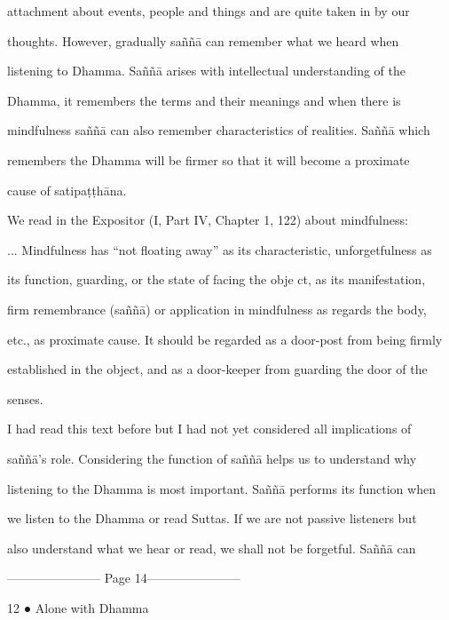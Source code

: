 attachment  about  events,  people  and  things  and  are  quite  taken  in  by  our  

thoughts.   However,   gradually   saññā   can   remember   what   we   heard   when  

listening   to   Dhamma.   Saññā   arises   with   intellectual   understanding   of   the  

Dhamma,   it   remembers   the   terms   and   their   meanings   and   when   there   is  

mindfulness saññā can also remember characteristics of realities. Saññā which  

remembers  the  Dhamma  will  be  firmer  so  that  it  will  become  a  proximate  

cause of satipaṭṭhāna. 



   We read in the Expositor (I, Part IV, Chapter 1, 122) about mindfulness: 



      ... Mindfulness has  “not floating away” as its characteristic, unforgetfulness as  

      its function, guarding, or the state of facing the obje ct, as its manifestation,  

      firm remembrance (saññā) or application in mindfulness as regards the body,  

      etc., as proximate cause. It should be regarded as a door-post from being firmly  

      established in the object, and as a  door-keeper from guarding the door of the  

      senses. 



I  had  read  this  text  before  but  I  had  not yet   considered  all  implications  of  

saññā’s  role.  Considering  the  function  of  saññā  helps  us  to  understand why  

listening to the Dhamma is most important. Saññā performs its function when  

we  listen to  the  Dhamma  or  read  Suttas.  If we  are  not  passive  listeners but  

also understand what we hear  or read, we  shall  not be  forgetful.  Saññā  can  


----------------------- Page 14-----------------------

12 ● Alone with Dhamma 



